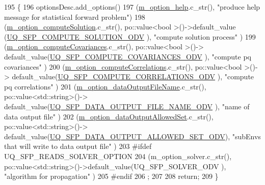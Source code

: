 \begin{DoxyCode}
195 \{
196   optionsDesc.add\_options()     
197     (\hyperlink{class_q_u_e_s_o_1_1_statistical_forward_problem_options_a6a48a27ad2c386feb7807e0623573fc5}{m\_option\_help}.c\_str(),                                                                   
                                 \textcolor{stringliteral}{"produce help message for statistical forward problem"})
198     (\hyperlink{class_q_u_e_s_o_1_1_statistical_forward_problem_options_a5e7c8a8383bb80a98ab4c271748e0d00}{m\_option\_computeSolution}.c\_str(),      po::value<bool       >()->default\_value
      (\hyperlink{_statistical_forward_problem_options_8h_a8ee85ee13d632a1e54c269c68af1a271}{UQ\_SFP\_COMPUTE\_SOLUTION\_ODV}       ), \textcolor{stringliteral}{"compute solution process"}                 
                 )
199     (\hyperlink{class_q_u_e_s_o_1_1_statistical_forward_problem_options_ad3f809f0695c126956afd86e07f77bc4}{m\_option\_computeCovariances}.c\_str(),   po::value<bool       >()->
      default\_value(\hyperlink{_statistical_forward_problem_options_8h_aa28405a39c7f3ee8c1cf3446ce315e2c}{UQ\_SFP\_COMPUTE\_COVARIANCES\_ODV}    ), \textcolor{stringliteral}{"compute pq covariances"}             
                       )
200     (\hyperlink{class_q_u_e_s_o_1_1_statistical_forward_problem_options_ad712823b5b7b3ce5c76a793a531f0f80}{m\_option\_computeCorrelations}.c\_str(),  po::value<bool       >()->
      default\_value(\hyperlink{_statistical_forward_problem_options_8h_aa0c31541814dd70982b6158e9c397ed1}{UQ\_SFP\_COMPUTE\_CORRELATIONS\_ODV}   ), \textcolor{stringliteral}{"compute pq correlations"}          
                         )
201     (\hyperlink{class_q_u_e_s_o_1_1_statistical_forward_problem_options_ad4f884177efb0d4ab7068dfe00861f9c}{m\_option\_dataOutputFileName}.c\_str(),   po::value<std::string>()->
      default\_value(\hyperlink{_statistical_forward_problem_options_8h_a671a3fb41ecb82838bd80d96d20f906b}{UQ\_SFP\_DATA\_OUTPUT\_FILE\_NAME\_ODV}  ), \textcolor{stringliteral}{"name of data output file"}         
                         )
202     (\hyperlink{class_q_u_e_s_o_1_1_statistical_forward_problem_options_a8f7d13eaec063727f412add0a1a4d9af}{m\_option\_dataOutputAllowedSet}.c\_str(), po::value<std::string>()->
      default\_value(\hyperlink{_statistical_forward_problem_options_8h_aacce4c79e6074eb5766f43705a605193}{UQ\_SFP\_DATA\_OUTPUT\_ALLOWED\_SET\_ODV}), \textcolor{stringliteral}{"subEnvs that will write to
       data output file"}         )
203 #ifdef UQ\_SFP\_READS\_SOLVER\_OPTION
204     (m\_option\_solver.c\_str(),               po::value<std::string>()->default\_value(UQ\_SFP\_SOLVER\_ODV      
                 ), \textcolor{stringliteral}{"algorithm for propagation"}                           )
205 #endif
206   ;
207 
208   \textcolor{keywordflow}{return};
209 \}
\end{DoxyCode}
